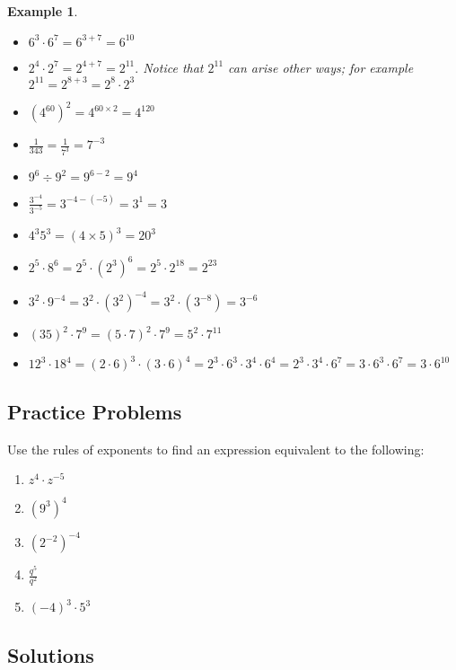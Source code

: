 \documentclass[11pt]{book}               %
\newtheorem{example}{Example}
\begin{document}
\bigskip
\begin{example}
$ $
\begin {itemize} 
\item $ 6^3 \cdot 6^7 = 6^{3+7} = 6^{10} $
\item $ 2^4 \cdot 2^7 = 2^{4+7} = 2^{11}. $ \normalfont Notice that $2^{11}$ can arise other ways; for example $ 2^{11} =2^{8+3} = 2^8 \cdot 2^3 $
\item $ (4^{60})^2 = 4^{60 \times 2} = 4^{120} $
\item $\frac{1}{343} = \frac{1}{7^3} = 7^{-3} $
\item $ 9^6 \div 9^2 = 9^{6-2} = 9^{4} $
\item $ \frac{3^{-4}}{3^{-5}} = 3^{-4- (-5 )} = 3^1 = 3 $
\item $ 4^3 5^3 =(4 \times 5)^3 = 20^{3} $
\item $ 2^5 \cdot 8^6 = 2^5 \cdot (2^3)^6 = 2^5 \cdot 2^{18} = 2^{23} $
\item $ 3^2 \cdot 9^{-4} = 3^2 \cdot (3^2)^{-4} = 3^2 \cdot (3^{-8}) = 3^{-6} $  
\item $ (35)^2 \cdot 7^9 = (5\cdot 7)^2 \cdot 7^{9} = 5^2 \cdot 7^{11} $ 
\item $ 12^3 \cdot 18^4 = (2\cdot 6)^3 \cdot (3\cdot 6)^4 = 2^3\cdot 6^3\cdot 3^4 \cdot 6^4 
= 2^3\cdot 3^4 \cdot 6^7 = 3\cdot 6^3\cdot 6^7= 3\cdot 6^{10}$
\end{itemize}
\end{example}


\subsection{Practice Problems}
Use the rules of exponents to find an expression equivalent to the following: 
\begin{enumerate}

\item $ z^4 \cdot z^{-5} $ 
\item $ (9^3)^4 $ 
\item $ (2^{-2})^{-4} $ 
\item $ \frac{q^5}{q^2}  $ 
\item $ (-4)^3 \cdot 5^3 $ 
\end{enumerate}

\subsection{Solutions}%
\end{document}
